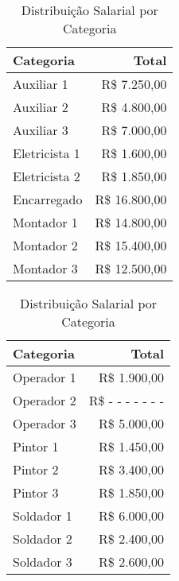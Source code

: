 \documentclass[a4paper, 12pt]{CSSullivanBusinessReport}
\begin{document}
\begin{fullwidth}
\begin{table}[h]
    \centering
    \caption{Distribuição Salarial por Categoria}
    \begin{minipage}{0.5\textwidth}
        \centering
        \begin{tabular}{lr}
            \toprule
            \textbf{Categoria} & \textbf{Total} \\ 
            \midrule
            Auxiliar 1 & R\$ 7.250,00 \\ 
            Auxiliar 2 & R\$ 4.800,00 \\ 
            Auxiliar 3 & R\$ 7.000,00 \\ 
            Eletricista 1 & R\$ 1.600,00 \\ 
            Eletricista 2 & R\$ 1.850,00 \\ 
            Encarregado & R\$ 16.800,00 \\ 
            Montador 1 & R\$ 14.800,00 \\ 
            Montador 2 & R\$ 15.400,00 \\ 
            Montador 3 & R\$ 12.500,00 \\ 
           \bottomrule
        \end{tabular}
    \end{minipage}\hfill
    \begin{minipage}{0.5\textwidth}
        \centering
        \begin{tabular}{lr}
            \toprule
            \textbf{Categoria} & \textbf{Total} \\ 
            \midrule
            Operador 1 & R\$ 1.900,00 \\ 
            Operador 2 & R\$ - - - - - - - \\
            Operador 3 & R\$ 5.000,00 \\ 
            Pintor 1 & R\$ 1.450,00 \\ 
            Pintor 2 & R\$ 3.400,00 \\ 
            Pintor 3 & R\$ 1.850,00 \\ 
            Soldador 1 & R\$ 6.000,00 \\ 
            Soldador 2 & R\$ 2.400,00 \\ 
            Soldador 3 & R\$ 2.600,00 \\
            \bottomrule
        \end{tabular}
        \label{tab:distrib}
    \end{minipage}
\end{table}


\end{fullwidth}
\end{document}
